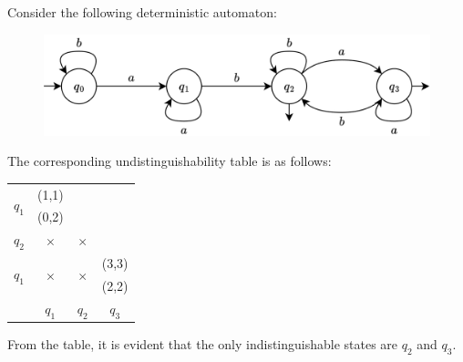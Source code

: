 \begin{example}
    Consider the following deterministic automaton: 
    \begin{figure}[H]
        \centering
        \includegraphics[width=0.75\linewidth]{images/fsamin.png}
    \end{figure}
    The corresponding undistinguishability table is as follows: 
    \begin{table}[H]
        \centering
        \begin{tabular}{cclcccc}
        \cline{2-3}
        \multicolumn{1}{c|}{\multirow{2}{*}{$q_1$}} & \multicolumn{2}{c|}{(1,1)}                     &                        &                       &              &             \\
        \multicolumn{1}{c|}{}                       & \multicolumn{2}{c|}{(0,2)}                     &                        &                       &              &             \\ \cline{2-5}
        \multicolumn{1}{c|}{\multirow{2}{*}{$q_2$}} & \multicolumn{2}{c|}{\multirow{2}{*}{$\times$}} & \multicolumn{2}{c|}{\multirow{2}{*}{$\times$}} &              &             \\
        \multicolumn{1}{c|}{}                       & \multicolumn{2}{c|}{}                          & \multicolumn{2}{c|}{}                          &              &             \\ \cline{2-7} 
        \multicolumn{1}{c|}{\multirow{2}{*}{$q_1$}} & \multicolumn{2}{c|}{\multirow{2}{*}{$\times$}} & \multicolumn{2}{c|}{\multirow{2}{*}{$\times$}} & \multicolumn{2}{c|}{(3,3)} \\
        \multicolumn{1}{c|}{}                       & \multicolumn{2}{c|}{}                          & \multicolumn{2}{c|}{}                          & \multicolumn{2}{c|}{(2,2)} \\ \cline{2-7} 
                                                    & \multicolumn{2}{c}{$q_1$}                      & \multicolumn{2}{c}{$q_2$}                      & \multicolumn{2}{c}{$q_3$} 
        \end{tabular}
    \end{table}
    From the table, it is evident that the only indistinguishable states are $q_2$ and $q_3$.
\end{example}

